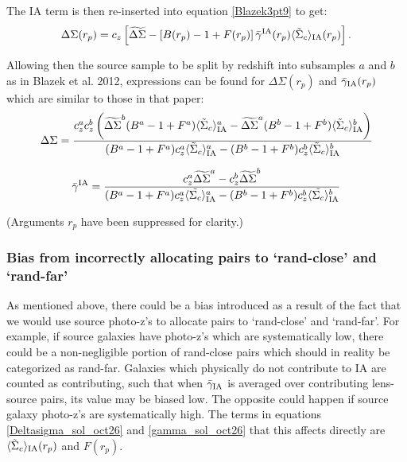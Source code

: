 \documentclass[onecolumn,amsmath,aps,fleqn, superscriptaddress]{revtex4}
\begin{document}
{The IA term is then re-inserted into equation \ref{Blazek3pt9} to get:
\begin{equation}
\Delta\Sigma(r_p) = c_z \left[\widetilde{\Delta \Sigma} - \left[B(r_p)-1 +F(r_p)\right]\bar{\gamma}^{\rm IA}(r_p)\langle \tilde{\Sigma}_c\rangle_{\rm IA} (r_p)\right].
\label{Blazek3pt9_v2}
\end{equation}

Allowing then the source sample to be split by redshift into subsamples $a$ and $b$ as in Blazek et al. 2012, expressions can be found for $\Delta \Sigma(r_p)$ and $\bar{\gamma}_{\rm IA}(r_p)$ which are similar to those in that paper:
\begin{equation}
\Delta\Sigma= \frac{c_z^a c_z^b\left(\widetilde{\Delta \Sigma}^b(B^a-1+F^a)\langle \tilde{\Sigma}_c\rangle_{\rm IA}^a - \widetilde{\Delta \Sigma}^a(B^b-1+F^b)\langle \tilde{\Sigma}_c\rangle_{\rm IA}^b\right)}{(B^a-1+F^a)c_z^a\langle \tilde{\Sigma}_c \rangle_{\rm IA}^a - (B^b-1+F^b)c_z^b\langle \tilde{\Sigma}_c \rangle_{\rm IA}^b}
\label{Deltasigma_sol_oct26}
\end{equation}

\begin{equation}
\bar{\gamma}^{\rm IA} = \frac{c_z^a \widetilde{\Delta\Sigma}^a - c_z^b \widetilde{\Delta\Sigma}^b}{(B^a-1+F^a)c_z^a \langle \tilde{\Sigma_c}\rangle_{\rm IA}^a -(B^b-1+F^b)c_z^b \langle \tilde{\Sigma_c}\rangle_{\rm IA}^b}
\label{gamma_sol_oct26}
\end{equation}

(Arguments $r_p$ have been suppressed for clarity.)

\subsubsection*{Bias from incorrectly allocating pairs to `rand-close' and `rand-far'}

As mentioned above, there could be a bias introduced as a result of the fact that we would use source photo-z's to allocate pairs to `rand-close' and `rand-far'. For example, if source galaxies have photo-z's which are systematically low, there could be a non-negligible portion of rand-close pairs which should in reality be categorized as rand-far. Galaxies which physically do not contribute to IA are counted as contributing, such that when $\bar{\gamma}_{\rm IA}$ is averaged over contributing lens-source pairs, its value may be biased low. The opposite could happen if source galaxy photo-z's are systematically high. The terms in equations \ref{Deltasigma_sol_oct26} and \ref{gamma_sol_oct26} that this affects directly are $\langle \tilde{\Sigma}_c\rangle_{\rm IA} (r_p)$ and $F(r_p)$.

}
\end{document}
